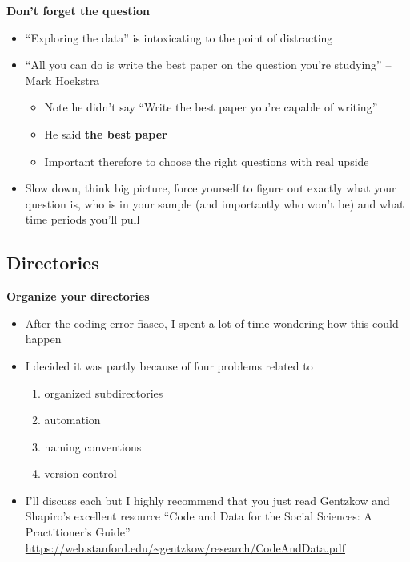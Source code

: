 \documentclass[notes=show]{beamer}
\begin{document}
\begin{frame}[plain]
\begin{center}
\textbf{Don't forget the question}
\end{center}


\begin{itemize}
\item ``Exploring the data'' is intoxicating to the point of distracting
\item ``All you can do is write the best paper on the question you're studying'' -- Mark Hoekstra
	\begin{itemize}
	\item Note he didn't say ``Write the best paper you're capable of writing''
	\item He said \textbf{the best paper}
	\item Important therefore to choose the right questions with real upside
	\end{itemize}
\item Slow down, think big picture, force yourself to figure out exactly what your question is, who is in your sample (and importantly who won't be) and what time periods you'll pull
\end{itemize}

\end{frame}


\subsection{Directories}


\begin{frame}
\begin{center}
\textbf{Organize your directories}
\end{center}

\begin{itemize}
\item After the coding error fiasco, I spent a lot of time wondering how this could happen
\item I decided it was partly because of four problems related to
	\begin{enumerate}
	\item organized subdirectories
	\item automation
	\item naming conventions
	\item version control
	\end{enumerate}
\item I'll discuss each but I highly recommend that you just read Gentzkow and Shapiro's excellent resource ``Code and Data for the Social Sciences: A Practitioner's Guide'' \url{https://web.stanford.edu/~gentzkow/research/CodeAndData.pdf}
\end{itemize}

\end{frame}
\end{document}
